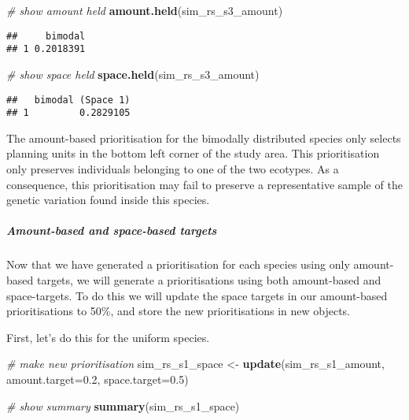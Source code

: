 \documentclass[11pt,]{article}
\newenvironment{Shaded}{\begin{snugshade}}{\end{snugshade}}
\newcommand{\KeywordTok}[1]{\textcolor[rgb]{0.13,0.29,0.53}{\textbf{{#1}}}}
\newcommand{\DataTypeTok}[1]{\textcolor[rgb]{0.13,0.29,0.53}{{#1}}}
\newcommand{\FloatTok}[1]{\textcolor[rgb]{0.00,0.00,0.81}{{#1}}}
\newcommand{\StringTok}[1]{\textcolor[rgb]{0.31,0.60,0.02}{{#1}}}
\newcommand{\CommentTok}[1]{\textcolor[rgb]{0.56,0.35,0.01}{\textit{{#1}}}}
\newcommand{\NormalTok}[1]{{#1}}
\begin{document}
\begin{Shaded}
\begin{Highlighting}[]
\CommentTok{# show amount held}
\KeywordTok{amount.held}\NormalTok{(sim_rs_s3_amount)}
\end{Highlighting}
\end{Shaded}

\begin{verbatim}
##     bimodal
## 1 0.2018391
\end{verbatim}

\begin{Shaded}
\begin{Highlighting}[]
\CommentTok{# show space held}
\KeywordTok{space.held}\NormalTok{(sim_rs_s3_amount)}
\end{Highlighting}
\end{Shaded}

\begin{verbatim}
##   bimodal (Space 1)
## 1         0.2829105
\end{verbatim}

The amount-based prioritisation for the bimodally distributed species
only selects planning units in the bottom left corner of the study area.
This prioritisation only preserves individuals belonging to one of the
two ecotypes. As a consequence, this prioritisation may fail to preserve
a representative sample of the genetic variation found inside this
species.

\subparagraph{Amount-based and space-based
targets}\label{amount-based-and-space-based-targets}

Now that we have generated a prioritisation for each species using only
amount-based targets, we will generate a prioritisations using both
amount-based and space-targets. To do this we will update the space
targets in our amount-based prioritisations to 50\%, and store the new
prioritisations in new objects.

First, let's do this for the uniform species.

\begin{Shaded}
\begin{Highlighting}[]
\CommentTok{# make new prioritisation}
\NormalTok{sim_rs_s1_space <-}\StringTok{ }\KeywordTok{update}\NormalTok{(sim_rs_s1_amount, }\DataTypeTok{amount.target=}\FloatTok{0.2}\NormalTok{, }\DataTypeTok{space.target=}\FloatTok{0.5}\NormalTok{)}
\end{Highlighting}
\end{Shaded}

\begin{Shaded}
\begin{Highlighting}[]
\CommentTok{# show summary}
\KeywordTok{summary}\NormalTok{(sim_rs_s1_space)}
\end{Highlighting}
\end{Shaded}
\end{document}
